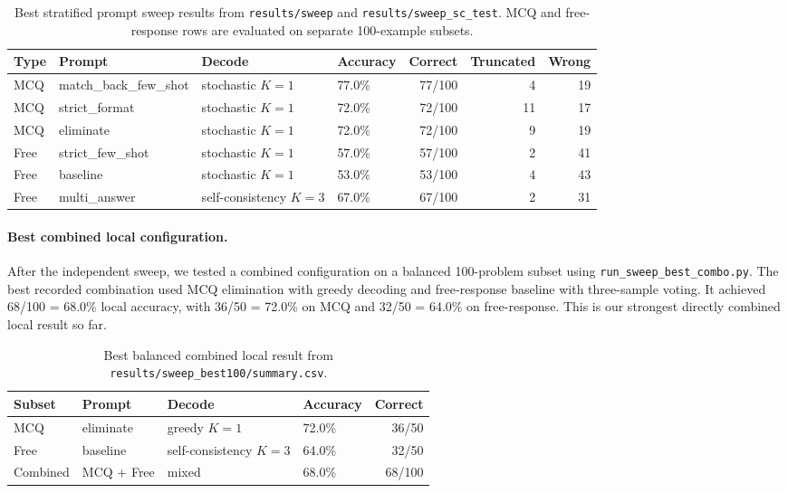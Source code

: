 \documentclass{article}
\begin{document}
\begin{table}[H]
\caption{Best stratified prompt sweep results from \texttt{results/sweep} and \texttt{results/sweep\_sc\_test}. MCQ and free-response rows are evaluated on separate 100-example subsets.}
\label{tab:stratified-sweep}
\centering
\begin{tabular}{llllrrr}
\toprule
Type & Prompt & Decode & Accuracy & Correct & Truncated & Wrong \\
\midrule
MCQ & match\_back\_few\_shot & stochastic $K=1$ & 77.0\% & 77/100 & 4 & 19 \\
MCQ & strict\_format & stochastic $K=1$ & 72.0\% & 72/100 & 11 & 17 \\
MCQ & eliminate & stochastic $K=1$ & 72.0\% & 72/100 & 9 & 19 \\
Free & strict\_few\_shot & stochastic $K=1$ & 57.0\% & 57/100 & 2 & 41 \\
Free & baseline & stochastic $K=1$ & 53.0\% & 53/100 & 4 & 43 \\
Free & multi\_answer & self-consistency $K=3$ & 67.0\% & 67/100 & 2 & 31 \\
\bottomrule
\end{tabular}
\end{table}

\paragraph{Best combined local configuration.}
After the independent sweep, we tested a combined configuration on a balanced 100-problem subset using \texttt{run\_sweep\_best\_combo.py}. The best recorded combination used MCQ elimination with greedy decoding and free-response baseline with three-sample voting. It achieved 68/100 = 68.0\% local accuracy, with 36/50 = 72.0\% on MCQ and 32/50 = 64.0\% on free-response. This is our strongest directly combined local result so far.

\begin{table}[H]
\caption{Best balanced combined local result from \texttt{results/sweep\_best100/summary.csv}.}
\label{tab:best-combo}
\centering
\begin{tabular}{llllr}
\toprule
Subset & Prompt & Decode & Accuracy & Correct \\
\midrule
MCQ & eliminate & greedy $K=1$ & 72.0\% & 36/50 \\
Free & baseline & self-consistency $K=3$ & 64.0\% & 32/50 \\
Combined & MCQ + Free & mixed & 68.0\% & 68/100 \\
\bottomrule
\end{tabular}
\end{table}
\end{document}
